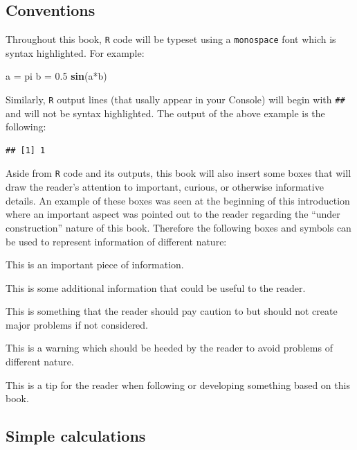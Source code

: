 \documentclass[]{book}
\newenvironment{Shaded}{\begin{snugshade}}{\end{snugshade}}
\newcommand{\KeywordTok}[1]{\textcolor[rgb]{0.13,0.29,0.53}{\textbf{{#1}}}}
\newcommand{\FloatTok}[1]{\textcolor[rgb]{0.00,0.00,0.81}{{#1}}}
\newcommand{\StringTok}[1]{\textcolor[rgb]{0.31,0.60,0.02}{{#1}}}
\newcommand{\NormalTok}[1]{{#1}}
\theoremstyle{definition}
\theoremstyle{definition}
\theoremstyle{remark}
\let\BeginKnitrBlock\begin \let\EndKnitrBlock\end
\begin{document}
\subsection{Conventions}\label{conventions}

Throughout this book, \texttt{R} code will be typeset using a
\texttt{monospace} font which is syntax highlighted. For example:

\begin{Shaded}
\begin{Highlighting}[]
\NormalTok{a =}\StringTok{ }\NormalTok{pi}
\NormalTok{b =}\StringTok{ }\FloatTok{0.5}
\KeywordTok{sin}\NormalTok{(a*b)}
\end{Highlighting}
\end{Shaded}

Similarly, \texttt{R} output lines (that usally appear in your Console)
will begin with \texttt{\#\#} and will not be syntax highlighted. The
output of the above example is the following:

\begin{verbatim}
## [1] 1
\end{verbatim}

Aside from \texttt{R} code and its outputs, this book will also insert
some boxes that will draw the reader's attention to important, curious,
or otherwise informative details. An example of these boxes was seen at
the beginning of this introduction where an important aspect was pointed
out to the reader regarding the ``under construction'' nature of this
book. Therefore the following boxes and symbols can be used to represent
information of different nature:

\BeginKnitrBlock{rmdimportant}
This is an important piece of information.
\EndKnitrBlock{rmdimportant}

\BeginKnitrBlock{rmdnote}
This is some additional information that could be useful to the reader.
\EndKnitrBlock{rmdnote}

\BeginKnitrBlock{rmdcaution}
This is something that the reader should pay caution to but should not
create major problems if not considered.
\EndKnitrBlock{rmdcaution}

\BeginKnitrBlock{rmdwarning}
This is a warning which should be heeded by the reader to avoid problems
of different nature.
\EndKnitrBlock{rmdwarning}

\BeginKnitrBlock{rmdtip}
This is a tip for the reader when following or developing something
based on this book.
\EndKnitrBlock{rmdtip}

\subsection{Simple calculations}\label{simple-calculations}
\end{document}
